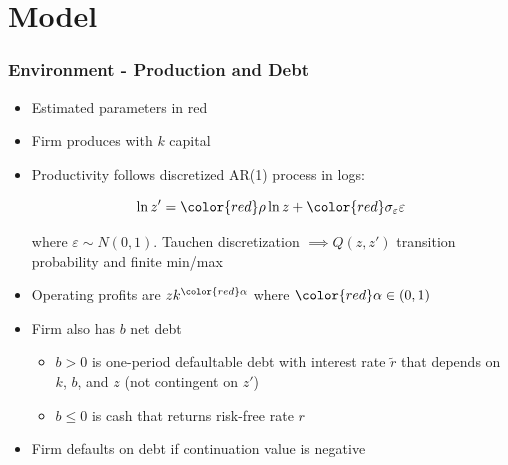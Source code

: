 \documentclass[usenames,dvipsnames, handout]{beamer}
\begin{document}

\section{Model}

\begin{frame}
\frametitle{Environment - Production and Debt}
\small
\begin{itemize}
\item Estimated parameters in {\color{red}red}
\item Firm produces with $k$ capital
\item Productivity follows discretized AR(1) process in logs: 

$$
\ln z' = {\color{red}\rho} \ln z + {\color{red}\sigma_\varepsilon} \varepsilon
$$

where $\varepsilon \sim N(0, 1)$. Tauchen discretization $\implies Q(z, z')$ transition probability and finite min/max
\item Operating profits are $z k^{\color{red}\alpha}$ where ${\color{red}\alpha} \in (0, 1)$
\item Firm also has $b$ net debt
\begin{itemize}
\item $b > 0$ is one-period defaultable debt with interest rate $\tilde r$ that depends on $k$, $b$, and $z$ (not contingent on $z'$)
\item $b \le 0$ is cash that returns risk-free rate $r$
\end{itemize}

\item Firm defaults on debt if continuation value is negative
\end{itemize}
\end{frame}
\end{document}
